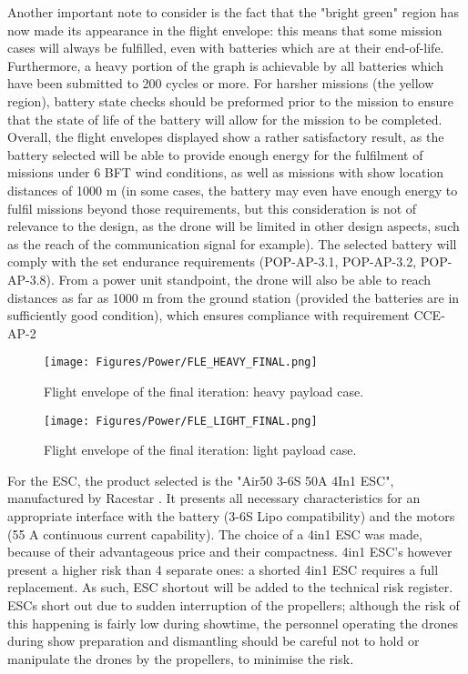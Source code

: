 Another important note to consider is the fact that the "bright green" region has now made its appearance in the flight envelope: this means that some mission cases will always be fulfilled, even with batteries which are at their end-of-life. Furthermore, a heavy portion of the graph is achievable by all batteries which have been submitted to 200 cycles or more. For harsher missions (the yellow region), battery state checks should be preformed prior to the mission to ensure that the state of life of the battery will allow for the mission to be completed. Overall, the flight envelopes displayed show a rather satisfactory result, as the battery selected will be able to provide enough energy for the fulfilment of missions under 6 BFT wind conditions, as well as missions with show location distances of 1000 m (in some cases, the battery may even have enough energy to fulfil missions beyond those requirements, but this consideration is not of relevance to the design, as the drone will be limited in other design aspects, such as the reach of the communication signal for example). The selected battery will comply with the set endurance requirements (POP-AP-3.1, POP-AP-3.2, POP-AP-3.8). From a power unit standpoint, the drone will also be able to reach distances as far as 1000 m from the ground station (provided the batteries are in sufficiently good condition), which ensures compliance with requirement CCE-AP-2

\begin{figure}[H]
    \centering
    \texttt{[image: Figures/Power/FLE\_HEAVY\_FINAL.png]}
    \caption{Flight envelope of the final iteration: heavy payload case.}
    \label{fig:FLE_HEAVY_FINAL}
\end{figure}

\begin{figure}[H]
    \centering
    \texttt{[image: Figures/Power/FLE\_LIGHT\_FINAL.png]}
    \caption{Flight envelope of the final iteration: light payload case.}
    \label{fig:FLE_LIGHT_FINAL}
\end{figure}

For the ESC, the product selected is the "Air50 3-6S 50A 4In1 ESC", manufactured by Racestar \cite{banggood_ESC}. It presents all necessary characteristics for an appropriate interface with the battery (3-6S Lipo compatibility) and the motors (55 A continuous current capability). The choice of a 4in1 ESC was made, because of their advantageous price and their compactness. 4in1 ESC's however present a higher risk than 4 separate ones: a shorted 4in1 ESC requires a full replacement. As such, ESC shortout will be added to the technical risk register. ESCs short out due to sudden interruption of the propellers; although the risk of this happening is fairly low during showtime, the personnel operating the drones during show preparation and dismantling should be careful not to hold or manipulate the drones by the propellers, to minimise the risk.


